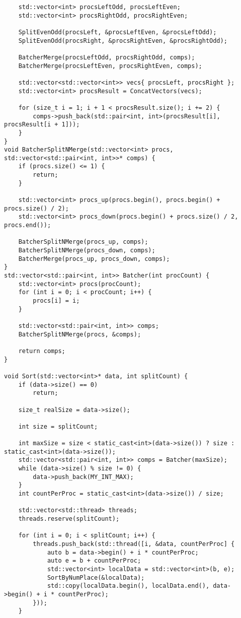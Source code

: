 \documentclass{report}
\begin{document}
\begin{lstlisting}
    std::vector<int> procsLeftOdd, procsLeftEven;
    std::vector<int> procsRightOdd, procsRightEven;

    SplitEvenOdd(procsLeft, &procsLeftEven, &procsLeftOdd);
    SplitEvenOdd(procsRight, &procsRightEven, &procsRightOdd);

    BatcherMerge(procsLeftOdd, procsRightOdd, comps);
    BatcherMerge(procsLeftEven, procsRightEven, comps);

    std::vector<std::vector<int>> vecs{ procsLeft, procsRight };
    std::vector<int> procsResult = ConcatVectors(vecs);

    for (size_t i = 1; i + 1 < procsResult.size(); i += 2) {
        comps->push_back(std::pair<int, int>(procsResult[i], procsResult[i + 1]));
    }
}
void BatcherSplitNMerge(std::vector<int> procs, std::vector<std::pair<int, int>>* comps) {
    if (procs.size() <= 1) {
        return;
    }

    std::vector<int> procs_up(procs.begin(), procs.begin() + procs.size() / 2);
    std::vector<int> procs_down(procs.begin() + procs.size() / 2, procs.end());

    BatcherSplitNMerge(procs_up, comps);
    BatcherSplitNMerge(procs_down, comps);
    BatcherMerge(procs_up, procs_down, comps);
}
std::vector<std::pair<int, int>> Batcher(int procCount) {
    std::vector<int> procs(procCount);
    for (int i = 0; i < procCount; i++) {
        procs[i] = i;
    }

    std::vector<std::pair<int, int>> comps;
    BatcherSplitNMerge(procs, &comps);

    return comps;
}

void Sort(std::vector<int>* data, int splitCount) {
    if (data->size() == 0)
        return;

    size_t realSize = data->size();

    int size = splitCount;

    int maxSize = size < static_cast<int>(data->size()) ? size : static_cast<int>(data->size());
    std::vector<std::pair<int, int>> comps = Batcher(maxSize);
    while (data->size() % size != 0) {
        data->push_back(MY_INT_MAX);
    }
    int countPerProc = static_cast<int>(data->size()) / size;

    std::vector<std::thread> threads;
    threads.reserve(splitCount);

    for (int i = 0; i < splitCount; i++) {
        threads.push_back(std::thread([i, &data, countPerProc] {
            auto b = data->begin() + i * countPerProc;
            auto e = b + countPerProc;
            std::vector<int> localData = std::vector<int>(b, e);
            SortByNumPlace(&localData);
            std::copy(localData.begin(), localData.end(), data->begin() + i * countPerProc);
        }));
    }


\end{lstlisting}
\end{document}
